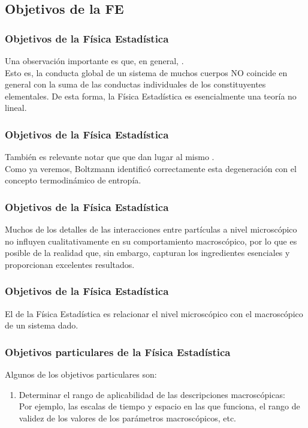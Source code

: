 \documentclass[12pt]{beamer}
\begin{document}
\subsection{Objetivos de la FE}

\begin{frame}
\frametitle{Objetivos de la Física Estadística}
Una observación importante es que, en general, .
\\
\bigskip
\pause
Esto es, la conducta global de un sistema de muchos cuerpos NO coincide en general con la suma de las conductas individuales de los constituyentes elementales. \pause De esta forma, la Física Estadística es esencialmente una teoría no lineal.
\end{frame}
\begin{frame}
\frametitle{Objetivos de la Física Estadística}  
También es relevante notar que  que dan lugar al mismo .
\\
\bigskip
\pause
Como ya veremos, Boltzmann identificó correctamente esta degeneración con el concepto termodinámico de entropía.
\end{frame}
\begin{frame}
\frametitle{Objetivos de la Física Estadística}  
Muchos de los detalles de las interacciones entre partículas a nivel microscópico no influyen cualitativamente en su comportamiento macroscópico, \pause por lo que es posible  de la realidad que, \pause sin embargo, capturan los ingredientes esenciales y proporcionan excelentes resultados.
\end{frame}
\begin{frame}
\frametitle{Objetivos de la Física Estadística}  
El  de la Física Estadística es relacionar el nivel microscópico con el macroscópico de un sistema dado.
\end{frame}
\begin{frame}
\frametitle{Objetivos particulares de la Física Estadística}  
Algunos de los objetivos particulares son:
\pause
{}
\begin{enumerate}[<+->]
\item Determinar el rango de aplicabilidad de las descripciones macroscópicas: 
\\ \pause
Por ejemplo, las escalas de tiempo y espacio en las que funciona, el rango de validez de los valores de los parámetros macroscópicos, etc.
\seti
\end{enumerate}
\end{frame}
\end{document}

